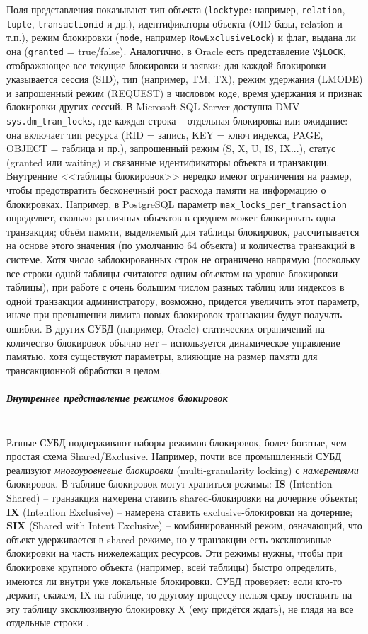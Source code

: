  Поля представления показывают тип объекта (\texttt{locktype}: например, \texttt{relation}, \texttt{tuple}, \texttt{transactionid} и др.), идентификаторы объекта (OID базы, relation и т.п.), режим блокировки (\texttt{mode}, например \texttt{RowExclusiveLock}) и флаг, выдана ли она (\texttt{granted} = true/false). Аналогично, в Oracle есть представление \texttt{V\$LOCK}, отображающее все текущие блокировки и заявки: для каждой блокировки указывается сессия (SID), тип (например, TM, TX), режим удержания (LMODE) и запрошенный режим (REQUEST) в числовом коде, время удержания и признак блокировки других сессий. В Microsoft SQL Server доступна DMV \texttt{sys.dm\_tran\_locks}, где каждая строка – отдельная блокировка или ожидание: она включает тип ресурса (RID = запись, KEY = ключ индекса, PAGE, OBJECT = таблица и пр.), запрошенный режим (S, X, U, IS, IX...), статус (granted или waiting) и связанные идентификаторы объекта и транзакции. Внутренние <<таблицы блокировок>> нередко имеют ограничения на размер, чтобы предотвратить бесконечный рост расхода памяти на информацию о блокировках. Например, в PostgreSQL параметр \texttt{max\_locks\_per\_transaction} определяет, сколько различных объектов в среднем может блокировать одна транзакция; объём памяти, выделяемый для таблицы блокировок, рассчитывается на основе этого значения (по умолчанию 64 объекта) и количества транзакций в системе. Хотя число заблокированных строк не ограничено напрямую (поскольку все строки одной таблицы считаются одним объектом на уровне блокировки таблицы), при работе с очень большим числом разных таблиц или индексов в одной транзакции администратору, возможно, придется увеличить этот параметр, иначе при превышении лимита новых блокировок транзакции будут получать ошибки. В других СУБД (например, Oracle) статических ограничений на количество блокировок обычно нет – используется динамическое управление памятью, хотя существуют параметры, влияющие на размер памяти для трансакционной обработки в целом. 
 
 \subparagraph{Внутреннее представление режимов блокировок} ~\\

 Разные СУБД поддерживают наборы режимов блокировок, более богатые, чем простая схема Shared/Exclusive. Например, почти все промышленный СУБД реализуют \textit{многоуровневые блокировки} (multi-granularity locking) с \textit{намерениями} блокировок. В таблице блокировок могут храниться режимы: \textbf{IS} (Intention Shared) – транзакция намерена ставить shared-блокировки на дочерние объекты; \textbf{IX} (Intention Exclusive) – намерена ставить exclusive-блокировки на дочерние; \textbf{SIX} (Shared with Intent Exclusive) – комбинированный режим, означающий, что объект удерживается в shared-режиме, но у транзакции есть эксклюзивные блокировки на часть нижележащих ресурсов. Эти режимы нужны, чтобы при блокировке крупного объекта (например, всей таблицы) быстро определить, имеются ли внутри уже локальные блокировки. СУБД проверяет: если кто-то держит, скажем, IX на таблице, то другому процессу нельзя сразу поставить на эту таблицу эксклюзивную блокировку X (ему придётся ждать), не глядя на все отдельные строки \autocite{sqlhack1}. 
 
